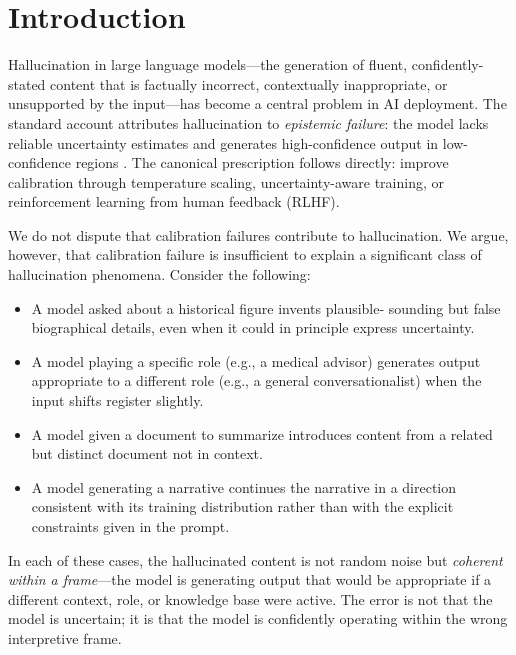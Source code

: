\documentclass[12pt]{article}
\begin{document}
\section{Introduction}

Hallucination in large language models---the generation of fluent,
confidently-stated content that is factually incorrect, contextually
inappropriate, or unsupported by the input---has become a central
problem in AI deployment. The standard account attributes
hallucination to \emph{epistemic failure}: the model lacks reliable
uncertainty estimates and generates high-confidence output in
low-confidence regions \cite{kadavath2022, lin2022, xiong2024}.
The canonical prescription follows directly: improve calibration
through temperature scaling, uncertainty-aware training, or
reinforcement learning from human feedback (RLHF).

We do not dispute that calibration failures contribute to
hallucination. We argue, however, that calibration failure is
insufficient to explain a significant class of hallucination
phenomena. Consider the following:

\begin{itemize}
\item A model asked about a historical figure invents plausible-
sounding but false biographical details, even when it could in
principle express uncertainty.
\item A model playing a specific role (e.g., a medical advisor)
generates output appropriate to a different role (e.g., a general
conversationalist) when the input shifts register slightly.
\item A model given a document to summarize introduces content
from a related but distinct document not in context.
\item A model generating a narrative continues the narrative in a
direction consistent with its training distribution rather than with
the explicit constraints given in the prompt.
\end{itemize}

In each of these cases, the hallucinated content is not random noise
but \emph{coherent within a frame}---the model is generating output
that would be appropriate if a different context, role, or knowledge
base were active. The error is not that the model is uncertain; it
is that the model is confidently operating within the wrong
interpretive frame.
\end{document}
